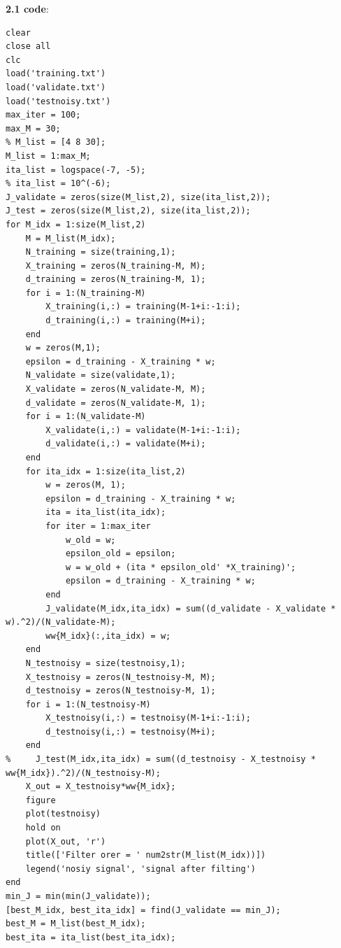 \documentclass[a4paper]{article}
\begin{document}
\begin{spacing}{2.0}
\newpage
\textbf{2.1 code}: 
\begin{lstlisting}
clear
close all
clc
load('training.txt')
load('validate.txt')
load('testnoisy.txt')
max_iter = 100;
max_M = 30;
% M_list = [4 8 30];
M_list = 1:max_M;
ita_list = logspace(-7, -5);
% ita_list = 10^(-6);
J_validate = zeros(size(M_list,2), size(ita_list,2));
J_test = zeros(size(M_list,2), size(ita_list,2));
for M_idx = 1:size(M_list,2)
    M = M_list(M_idx);
	N_training = size(training,1);
    X_training = zeros(N_training-M, M);
    d_training = zeros(N_training-M, 1);
    for i = 1:(N_training-M)
        X_training(i,:) = training(M-1+i:-1:i);
        d_training(i,:) = training(M+i);
    end
    w = zeros(M,1);
    epsilon = d_training - X_training * w;
    N_validate = size(validate,1);
    X_validate = zeros(N_validate-M, M);
    d_validate = zeros(N_validate-M, 1);
    for i = 1:(N_validate-M)
        X_validate(i,:) = validate(M-1+i:-1:i);
        d_validate(i,:) = validate(M+i);
    end
    for ita_idx = 1:size(ita_list,2)
        w = zeros(M, 1);
        epsilon = d_training - X_training * w;
        ita = ita_list(ita_idx);
        for iter = 1:max_iter
            w_old = w;
            epsilon_old = epsilon;
            w = w_old + (ita * epsilon_old' *X_training)';
            epsilon = d_training - X_training * w;
        end
        J_validate(M_idx,ita_idx) = sum((d_validate - X_validate * w).^2)/(N_validate-M);
        ww{M_idx}(:,ita_idx) = w;
    end
    N_testnoisy = size(testnoisy,1);
    X_testnoisy = zeros(N_testnoisy-M, M);
    d_testnoisy = zeros(N_testnoisy-M, 1);
    for i = 1:(N_testnoisy-M)
        X_testnoisy(i,:) = testnoisy(M-1+i:-1:i);
        d_testnoisy(i,:) = testnoisy(M+i);
    end
%     J_test(M_idx,ita_idx) = sum((d_testnoisy - X_testnoisy * ww{M_idx}).^2)/(N_testnoisy-M);
    X_out = X_testnoisy*ww{M_idx};
    figure
    plot(testnoisy)
    hold on
    plot(X_out, 'r')
    title(['Filter orer = ' num2str(M_list(M_idx))])
    legend('nosiy signal', 'signal after filting')
end
min_J = min(min(J_validate));
[best_M_idx, best_ita_idx] = find(J_validate == min_J);
best_M = M_list(best_M_idx);
best_ita = ita_list(best_ita_idx);
\end{lstlisting}	


\end{spacing}
\end{document}
